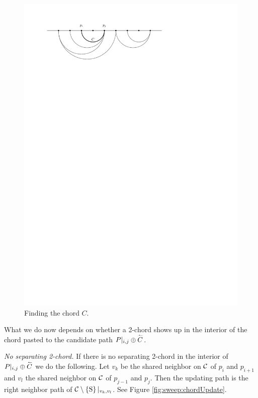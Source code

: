     \begin{figure}[b]
      \centering
      \includegraphics[scale=1]{unifiedalgo/img/sweep/chordsOnCandidatePath}
      \caption{Finding the chord $C$.}
      \label{fig:sweep:chordsOnCandidatePath}
    \end{figure}

    What we do now depends on whether a 2-chord shows up in the interior of the chord pasted to the candidate path $P|_{i, j} \oplus \accentset{\leftharpoonup}{{C}}$.

    \emph{No separating 2-chord.}
    If there is no separating 2-chord in the interior of $P|_{i, j} \oplus \accentset{\leftharpoonup}{{C}}$ we do the following. Let $v_k$ be the shared neighbor on $\mathcal{C}$ of $p_{i}$ and $p_{i +1}$ and $v_l$ the shared neighbor on $\mathcal{C}$ of $p_{j -1}$ and $p_{j}$. Then the updating path is the right neighbor path of $\mathcal{C} \setminus \left\lbrace {\mathrm{S}} \right\rbrace|_{v_k, v_l}$. See Figure \ref{fig:sweep:chordUpdate}.

